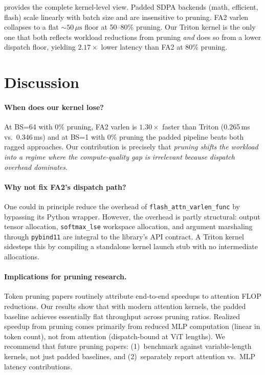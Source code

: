 \documentclass[conference]{IEEEtran}
\newcommand{\us}{\,\mu\text{s}}
\begin{document}
 provides the complete kernel-level view.
Padded SDPA backends (math, efficient, flash) scale linearly with
batch size and are insensitive to pruning.
FA2 varlen collapses to a flat ${\sim}50\us$ floor at 50--80\%
pruning.
Our Triton kernel is the only one that both reflects workload
reductions from pruning \emph{and} does so from a lower dispatch
floor, yielding $2.17\times$ lower latency than FA2 at 80\% pruning.

\section{Discussion}\label{sec:discussion}

\paragraph{When does our kernel lose?}
At BS=64 with 0\% pruning, FA2 varlen is $1.30\times$ faster than
Triton (0.265\,ms vs.\ 0.346\,ms) and at BS=1 with 0\% pruning
the padded pipeline beats both ragged approaches.
Our contribution is precisely that \emph{pruning shifts the workload
into a regime where the compute-quality gap is irrelevant because
dispatch overhead dominates}.

\paragraph{Why not fix FA2's dispatch path?}
One could in principle reduce the overhead of
\texttt{flash\_attn\_varlen\_func} by bypassing its Python wrapper.
However, the overhead is partly structural: output tensor allocation,
\texttt{softmax\_lse} workspace allocation, and argument marshaling
through \texttt{pybind11} are integral to the library's API contract.
A Triton kernel sidesteps this by compiling a standalone kernel launch
stub with no intermediate allocations.

\paragraph{Implications for pruning research.}
Token pruning papers routinely attribute end-to-end speedups to
attention FLOP reductions.
Our results show that with modern attention kernels, the padded
baseline achieves essentially flat throughput across pruning ratios.
Realized speedup from pruning comes primarily from reduced MLP
computation (linear in token count), not from attention (dispatch-bound
at ViT lengths).
We recommend that future pruning papers: (1)~benchmark against
variable-length kernels, not just padded baselines, and
(2)~separately report attention vs.\ MLP latency contributions.
\end{document}
